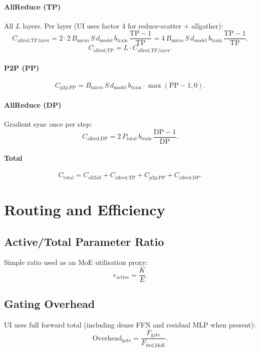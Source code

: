 \documentclass[11pt]{article}
\begin{document}
\paragraph{AllReduce (TP)}
All $L$ layers. Per layer (UI uses factor 4 for reduce-scatter + allgather):
\[
C_{\text{allred,TP,layer}} =
2 \cdot 2 \, B_{\text{micro}} \, S \, d_{\text{model}} \, b_{\text{train}}
\,\frac{\mathrm{TP}-1}{\mathrm{TP}}
= 4 \, B_{\text{micro}} \, S \, d_{\text{model}} \, b_{\text{train}}
\,\frac{\mathrm{TP}-1}{\mathrm{TP}}.
\]
\[
C_{\text{allred,TP}} = L \cdot C_{\text{allred,TP,layer}}.
\]

\paragraph{P2P (PP)}
\[
C_{\text{p2p,PP}} =
B_{\text{micro}} \, S \, d_{\text{model}} \, b_{\text{train}}
\cdot \max(\mathrm{PP}-1, 0).
\]

\paragraph{AllReduce (DP)}
Gradient sync once per step:
\[
C_{\text{allred,DP}} =
2 \, P_{\text{total}} \, b_{\text{train}}
\,\frac{\mathrm{DP}-1}{\mathrm{DP}}.
\]

\paragraph{Total}
\[
C_{\text{total}} =
C_{\text{all2all}} + C_{\text{allred,TP}} +
C_{\text{p2p,PP}} + C_{\text{allred,DP}}.
\]

\section{Routing and Efficiency}

\subsection{Active/Total Parameter Ratio}

Simple ratio used as an MoE utilisation proxy:
\[
r_{\text{active}} = \frac{K}{E}.
\]

\subsection{Gating Overhead}

UI uses full forward total (including dense FFN and residual MLP when present):
\[
\text{Overhead}_{\text{gate}} =
\frac{F_{\text{gate}}}{F_{\text{fwd,MoE}}}.
\]
\end{document}
